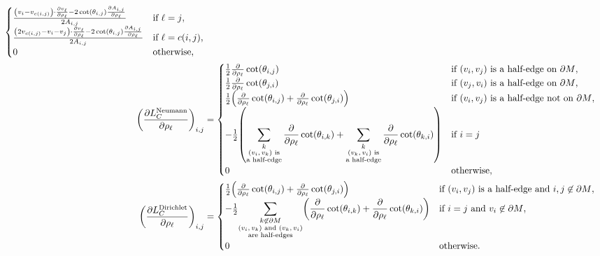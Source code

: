 \begin{align*}
\begin{cases}
		\frac{\pof{v_i - v_{c\pof{i, j}}} \cdot \frac{\partial v_\ell}{\partial \rho_\ell} - 2\cot\pof{\theta_{i, j}}\frac{\partial A_{i, j}}{\partial \rho_\ell}}{2A_{i, j}} & \text{if \(\ell = j\)}, \\
		\frac{\pof{2v_{c\pof{i, j}} - v_i - v_j} \cdot \frac{\partial v_\ell}{\partial \rho_\ell} - 2\cot\pof{\theta_{i, j}}\frac{\partial A_{i, j}}{\partial \rho_\ell}}{2A_{i, j}} & \text{if \(\ell = c\pof{i, j}\)}, \\
		0 & \text{otherwise},
	\end{cases} \\
	\pof{\frac{\partial L_C^{\text{Neumann}}}{\partial \rho_\ell}}_{i, j} &= \begin{cases}
		\frac{1}{2}\frac{\partial}{\partial \rho_\ell}\cot\pof{\theta_{i, j}} & \text{if \(\pof{v_i, v_j}\) is a half-edge on \(\partial M\)}, \\
		\frac{1}{2}\frac{\partial}{\partial \rho_\ell}\cot\pof{\theta_{j, i}} & \text{if \(\pof{v_j, v_i}\) is a half-edge on \(\partial M\)}, \\
		\frac{1}{2}\pof{\frac{\partial}{\partial \rho_\ell}\cot\pof{\theta_{i, j}} + \frac{\partial}{\partial \rho_\ell}\cot\pof{\theta_{j, i}}} & \text{if \(\pof{v_i, v_j}\) is a half-edge not on \(\partial M\)}, \\
		-\frac{1}{2}\pof{\displaystyle\sum_{\substack{k \\ \text{\(\pof{v_i, v_k}\) is} \\ \text{a half-edge}}}\frac{\partial}{\partial \rho_\ell}\cot\pof{\theta_{i, k}} + \sum_{\substack{k \\ \text{\(\pof{v_k, v_i}\) is} \\ \text{a half-edge}}}\frac{\partial}{\partial \rho_\ell}\cot\pof{\theta_{k, i}}} & \text{if \(i = j\)} \\
		0 & \text{otherwise},
	\end{cases} \\
	\pof{\frac{\partial L_C^{\text{Dirichlet}}}{\partial \rho_\ell}}_{i, j} &= \begin{cases}
		\frac{1}{2}\pof{\frac{\partial}{\partial \rho_\ell}\cot\pof{\theta_{i, j}} + \frac{\partial}{\partial \rho_\ell}\cot\pof{\theta_{j, i}}} & \text{if \(\pof{v_i, v_j}\) is a half-edge and \(i, j \not\in \partial M\)}, \\
		-\frac{1}{2}{\displaystyle\sum_{\substack{k \not\in \partial M \\ \text{\(\pof{v_i, v_k}\) and \(\pof{v_k, v_i}\)} \\ \text{are half-edges}}}\pof{\frac{\partial}{\partial \rho_\ell}\cot\pof{\theta_{i, k}} + \frac{\partial}{\partial \rho_\ell}\cot\pof{\theta_{k, i}}}} & \text{if \(i = j\) and \(v_i \not\in \partial M\)}, \\
		0 & \text{otherwise}.
	\end{cases}
\end{align*}